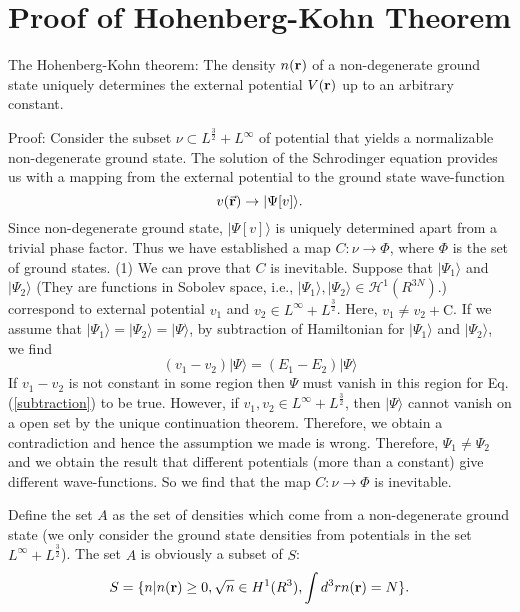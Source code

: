 \chapter{Proof of Hohenberg-Kohn Theorem} \label{proof_HK}
The Hohenberg-Kohn theorem: The density $n({\bf r})$ of a non-degenerate ground state uniquely determines the external potential $V({\bf r})$ up to an arbitrary constant.

Proof:
Consider the subset $\mathscr{\nu}\subset L^{\frac{3}{2}}+L^{\infty}$ of potential that yields a normalizable non-degenerate ground state. The solution of the Schrodinger equation provides us with a mapping from the external potential to the ground state wave-function
\begin{equation}
 v(\vec {\bf r})\rightarrow |\Psi[v]\rangle.
\end{equation}
Since non-degenerate ground state, $|\Psi[v]\rangle$ is uniquely determined apart from a trivial phase factor.
Thus we have established a map $C: \mathscr{\nu}\rightarrow \Phi$, where $\Phi$ is the set of ground states.
(1) We can prove that $C$ is inevitable. Suppose that $|\Psi_1\rangle$ and $|\Psi_2\rangle$ (They are functions in Sobolev space, i.e.,  $|\Psi_1\rangle, |\Psi_2\rangle \in \mathscr{H}^1(R^{3N})$.) correspond to external potential $v_1$ and $v_2 \in L^{\infty}+L^{\frac{3}{2}}$. Here, $v_1 \neq v_2+\text{C}$. If we assume that $|\Psi_1\rangle=|\Psi_2\rangle=|\Psi\rangle$, by subtraction of Hamiltonian for  $|\Psi_1\rangle$ and $|\Psi_2\rangle$, we find
\begin{equation}
 (v_1-v_2)|\Psi\rangle = (E_1-E_2)|\Psi\rangle
\label{subtraction}
 \end{equation}
If $v_1-v_2$ is  not constant in some region then $\Psi$ must vanish in this region for 
Eq.\thinspace(\ref{subtraction}) to be true. However, if $v_1, v_2 \in L^{\infty}+L^{\frac{3}{2}}$, 
then $|\Psi\rangle$ cannot vanish on a open set by the unique continuation theorem. 
Therefore, we obtain a contradiction and hence the assumption we made is wrong. 
Therefore, $\Psi_1 \neq \Psi_2$ and we obtain the result that different potentials 
(more than a constant) give different wave-functions.  
So we find that the map $C: \mathscr{\nu}\rightarrow \Phi$ is inevitable.

Define the set $A$ as the set of densities which come from a non-degenerate ground state (we only consider the ground 
state densities from potentials in the set $L^{\infty}+L^{\frac{3}{2}}$). The set $A$ is obviously a subset of $S$:
\begin{equation}
S=\{n|n({\bf r})\geq0, \sqrt{n}\in H^1(R^3), \int d^3rn({\bf r})=N\} .
\end{equation}

